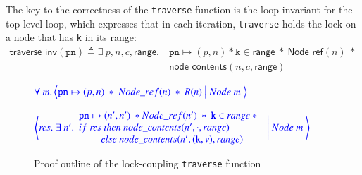 \documentclass[a4paper,UKenglish,cleveref, autoref, thm-restate]{lipics-v2021}
\newcommand{\treerep}{\ensuremath{\mathsf{Node}}}
\newcommand{\nodeboxrep}{\ensuremath{\mathsf{Node\_ref}}}
\begin{document}

The key to the correctness of the \texttt{traverse} function is the loop invariant for the top-level loop, which expresses that in each iteration, \lstinline{traverse} holds the lock on a node that has \lstinline{k} in its range:
\begin{align*}\mathsf{traverse\_inv}(\texttt{pn}) \triangleq \exists \ p, n, c, \mathsf{range}.\ &\texttt{pn} \mapsto (p, n) \ast \texttt{k} \in \mathsf{range}\ \ast \  \nodeboxrep(n)  \ \ast \\  &\mathsf{node\_contents}(n, c, \mathsf{range})
\end{align*}

\begin{figure}[!ht]
	$\color{blue}
	\forall \  m. \left\langle \texttt{pn} \mapsto (p, n) \ \ast \ 
	\nodeboxrep(n)  \ \ast \ \mathsf{R}(n) \ \big| \ \treerep\ m \
	\right\rangle$
		
	$\color{blue}
	\left\langle \mathit{res}. \ \exists \  n'.
	\begin{array}{l} \texttt{pn} \mapsto (n', n') \ \ast \nodeboxrep(n') \ \ast\ \texttt{k} \in \mathsf{range}\ \ast\ 
		\\ 
		\mathsf{if} \ \mathit{res} \ \mathsf{then} \ \mathsf{node\_contents}(n', \cdot, \mathsf{range}) \ 
		\\ \ \ \ \ \ \ \ \ \ \mathsf{else} \ \mathsf{node\_contents}(n', (\texttt{k}, v), \mathsf{range})
	\end{array}
	\ \Bigg| \ \treerep\ m \
	\right\rangle$
	\caption{Proof outline of the lock-coupling \texttt{traverse} function}
	\label{proof_lock_traverse}
\end{figure}
\end{document}
